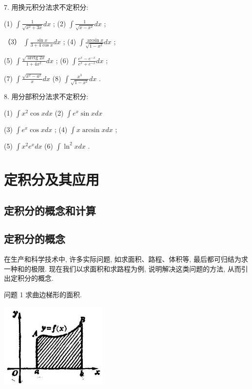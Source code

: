 \documentclass[lang=cn,newtx,10pt,scheme=chinese]{elegantbook}
\begin{document}
7. 用换元积分法求不定积分:

(1) \(\int \frac{1}{\sqrt{{x}^{2} + {3x}}}{dx}\) ; (2) \(\int \frac{1}{\sqrt{x - {x}^{2}}}{dx}\) ;

（3） \(\int \frac{\sin x}{3 + 4\cos x}{dx}\) ; (4) \(\int \frac{\arcsin x}{\sqrt{1 - {x}^{2}}}{dx}\) ;

(5) \(\int \frac{\sqrt{\operatorname{arctg}{2x}}}{1 + 4{x}^{2}}{dx}\) ; (6) \(\int \frac{{e}^{x} - {e}^{-x}}{{e}^{x} + {e}^{-x}}{dx}\) ;

(7) \(\int \frac{\sqrt{{x}^{2} - {a}^{2}}}{x}{dx}\) (8) \(\int \frac{{x}^{3}}{\sqrt{1 - {x}^{2}}}{dx}\) .

8. 用分部积分法求不定积分:

(1) \(\int {x}^{2}\cos {xdx}\) (2) \(\int {e}^{x}\sin {xdx}\)

(3) \(\int {e}^{x}\cos {xdx}\) ; (4) \(\int x\arcsin {xdx}\) ;

(5) \(\int {x}^{2}{e}^{x}{dx}\) (6) \(\int {\ln }^{2}{xdx}\) .

\chapter{定积分及其应用}

\section*{定积分的概念和计算}

\section{定积分的概念}

在生产和科学技术中, 许多实际问题, 如求面积、路程、体积等, 最后都可归结为求一种和的极限. 现在我们以求面积和求路程为例, 说明解决这类问题的方法, 从而引出定积分的概念.

问题 1 求曲边梯形的面积.

\begin{center}
\includegraphics[max width=0.4\textwidth]{images/01912c18-5c3f-733d-b775-749ba9897a9d_216_110266.jpg}
\end{center}
\end{document}

